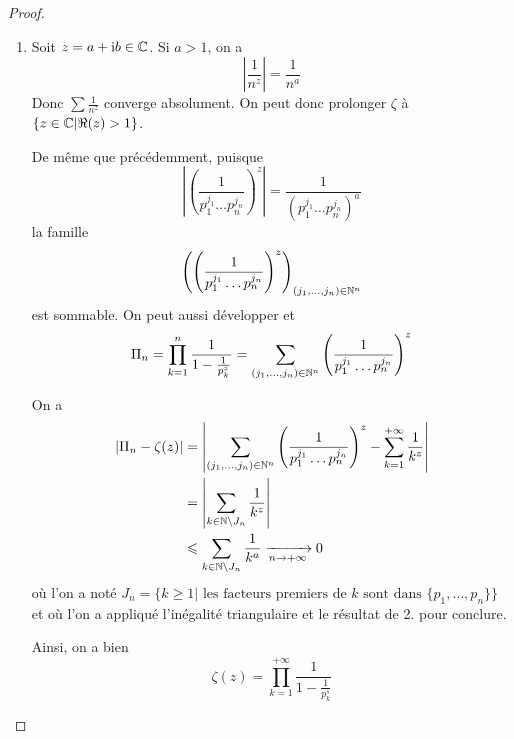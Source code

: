 \begin{proof}
\begin{enumerate}
		\item Soit $z=a+\mathrm{i} b\in\mathbb{C}$. Si $a>1$, on a 
		$$\left\vert\frac{1}{n^{z}}\right\vert=\frac{1}{n^{a}}$$
		Donc $\sum \frac{1}{n^{z}}$ converge absolument. On peut donc prolonger $\zeta$ à $\left\{z\in\mathbb{C}\middle|\Re(z)>1\right\}$.

		De même que précédemment, puisque 
		$$\left\vert\left(\frac{1}{p_{1}^{j_{1}}\dots p_{n}^{j_{n}}}\right)^{z}\right\vert=\frac{1}{\left(p_{1}^{j_{1}}\dots p_{n}^{j_{n}}\right)^{a}}$$
		la famille 
		$$\left(\left(\frac{1}{p_{1}^{j_{1}}\dots p_{n}^{j_{n}}}\right)^{z}\right)_{(j_{1},\dots,j_{n})\in\mathbb{N}^{n}}$$
		est sommable. On peut aussi développer et 
		$$\Pi_{n}=\prod_{k=1}^{n}\frac{1}{1-\frac{1}{p_{k}^{z}}}=\sum_{(j_{1},\dots,j_{n})\in\mathbb{N}^{n}}\left(\frac{1}{p_{1}^{j_{1}}\dots p_{n}^{j_{n}}}\right)^{z}$$
		
		On a 
		\begin{align*}
			\left\vert\Pi_{n}-\zeta(z)\right\vert
			&=\left\vert\sum_{(j_{1},\dots,j_{n})\in\mathbb{N}^{n}}\left(\frac{1}{p_{1}^{j_{1}}\dots p_{n}^{j_{n}}}\right)^{z}-\sum_{k=1}^{+\infty}\frac{1}{k^{z}}\right\vert\\
			&=\left\vert\sum_{k\in\mathbb{N}\setminus J_{n}}\frac{1}{k^{z}}\right\vert\\
			&\leqslant \sum_{k\in\mathbb{N}\setminus J_{n}}\frac{1}{k^{a}}\xrightarrow[n\to+\infty]{}0
		\end{align*}
		où l'on a noté $J_{n}=\{k\geqslant 1|\text{ les facteurs premiers de }k\text{ sont dans }\{p_{1},\dots,p_{n}\}\}$ et où l'on a appliqué l'inégalité triangulaire et le résultat de 2. pour conclure.

		Ainsi, on a bien 
		$$\boxed{\zeta(z)=\prod_{k=1}^{+\infty}\frac{1}{1-\frac{1}{p_{k}^{s}}}}$$
	\end{enumerate}
\end{proof}

